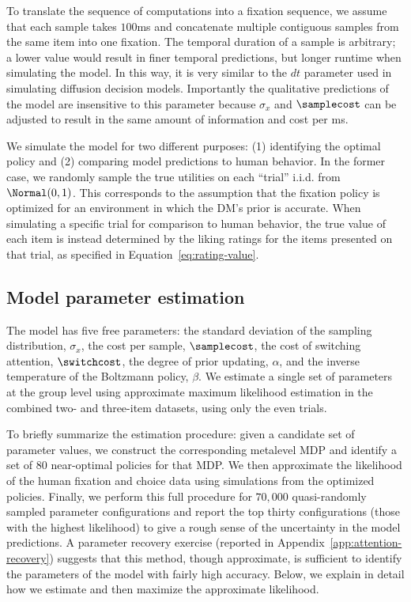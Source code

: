 To translate the sequence of computations into a fixation sequence, we assume that each sample takes $100$ms and concatenate multiple contiguous samples from the same item into one fixation. The temporal duration of a sample is arbitrary; a lower value would result in finer temporal predictions, but longer runtime when simulating the model. In this way, it is very similar to the $dt$ parameter used in simulating diffusion decision models. Importantly the qualitative predictions of the model are insensitive to this parameter because $\sigma_x$ and $\samplecost$ can be adjusted to result in the same amount of information and cost per ms. 

We simulate the model for two different purposes: (1) identifying the optimal policy and (2) comparing model predictions to human behavior. In the former case, we randomly sample the true utilities on each ``trial'' i.i.d. from $\Normal(0,1)$. This corresponds to the assumption that the fixation policy is optimized for an environment in which the DM's prior is accurate. When simulating a specific trial for comparison to human behavior, the true value of each item is instead determined by the liking ratings for the items presented on that trial, as specified in Equation~\ref{eq:rating-value}.


\subsection{Model parameter estimation}\label{sec:attention-estimation}

The model has five free parameters: the standard deviation of the sampling distribution, $\sigma_{x}$, the cost per sample, $\samplecost$, the cost of switching attention, $\switchcost$, the degree of prior updating, $\alpha$, and the inverse temperature of the Boltzmann policy, $\beta$. We estimate a single set of parameters at the group level using approximate maximum likelihood estimation in the combined two- and three-item datasets, using only the even trials.

To briefly summarize the estimation procedure: given a candidate set of parameter values, we construct the corresponding metalevel MDP and identify a set of $80$ near-optimal policies for that MDP. We then approximate the likelihood of the human fixation and choice data using simulations from the optimized policies. Finally, we perform this full procedure for $70{,}000$ quasi-randomly sampled parameter configurations and report the top thirty configurations (those with the highest likelihood) to give a rough sense of the uncertainty in the model predictions. A parameter recovery exercise (reported in Appendix~\ref{app:attention-recovery}) suggests that this method, though approximate, is sufficient to identify the parameters of the model with fairly high accuracy. Below, we explain in detail how we estimate and then maximize the approximate likelihood.
 

